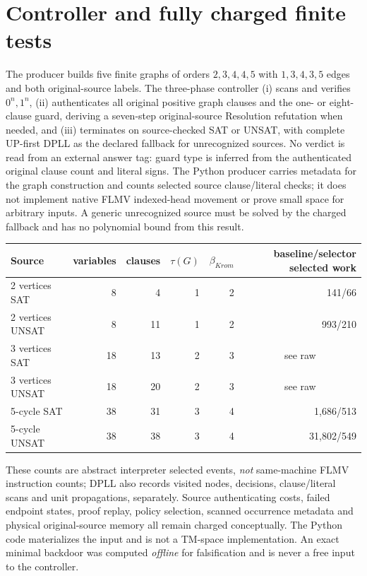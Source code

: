 \documentclass[11pt]{article}
\begin{document}
\section*{Controller and fully charged finite tests}
The producer builds five finite graphs of orders $2,3,4,4,5$ with $1,3,4,3,5$ edges and both original-source labels. The three-phase controller (i) scans and verifies $0^n,1^n$, (ii) authenticates all original positive graph clauses and the one- or eight-clause guard, deriving a seven-step original-source Resolution refutation when needed, and (iii) terminates on source-checked SAT or UNSAT, with complete UP-first DPLL as the declared fallback for unrecognized sources. No verdict is read from an external answer tag: guard type is inferred from the authenticated original clause count and literal signs. The Python producer carries metadata for the graph construction and counts selected source clause/literal checks; it does not implement native FLMV indexed-head movement or prove small space for arbitrary inputs. A generic unrecognized source must be solved by the charged fallback and has no polynomial bound from this result.

\begin{center}\small
\begin{tabular}{lrrrrr}\toprule
Source & variables & clauses & $\tau(G)$ & $\beta_{Krom}$ & baseline/selector selected work\\\midrule
2 vertices SAT & 8 & 4 & 1 & 2 & 141/66\\
2 vertices UNSAT & 8 & 11 & 1 & 2 & 993/210\\
3 vertices SAT & 18 & 13 & 2 & 3 & \multicolumn{1}{c}{see raw}\\
3 vertices UNSAT & 18 & 20 & 2 & 3 & \multicolumn{1}{c}{see raw}\\
5-cycle SAT & 38 & 31 & 3 & 4 & 1,686/513\\
5-cycle UNSAT & 38 & 38 & 3 & 4 & 31,802/549\\\bottomrule
\end{tabular}
\end{center}
These counts are abstract interpreter selected events, \emph{not} same-machine FLMV instruction counts; DPLL also records visited nodes, decisions, clause/literal scans and unit propagations, separately. Source authenticating costs, failed endpoint states, proof replay, policy selection, scanned occurrence metadata and physical original-source memory all remain charged conceptually. The Python code materializes the input and is not a TM-space implementation. An exact minimal backdoor was computed \emph{offline} for falsification and is never a free input to the controller.
\end{document}
